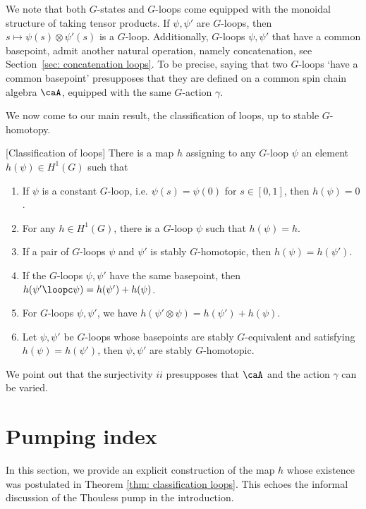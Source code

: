 We note that both $G$-states and $G$-loops come equipped with the monoidal structure of taking tensor products. If $\psi,\psi'$ are $G$-loops, then $s\mapsto \psi(s)\otimes\psi'(s)$ is a $G$-loop. Additionally, $G$-loops $\psi,\psi'$ that  have a common basepoint, 
admit another natural operation, namely concatenation, see Section~\ref{sec: concatenation loops}.  To be precise, saying that two $G$-loops `have a common basepoint' presupposes that they are defined on a common spin chain algebra $\caA$, equipped with the same $G$-action $\gamma$.

We now  come to our main result, the classification of loops, up to stable $G$-homotopy.


\begin{theorem}\label{thm: classification loops} [Classification of loops]
	There is a map $h$ assigning to any $G$-loop $\psi$ an element  $h(\psi) \in H^1(G)$ such that 
	\begin{enumerate}
		\item If $\psi$ is a constant $G$-loop, i.e. $\psi(s)=\psi(0)$ for $s\in[0,1]$, then $h(\psi)=0$. 
		\item For any $h \in H^1(G)$, there is a $G$-loop $\psi$ such that $h(\psi)=h$. 
		\item If a pair of $G$-loops $\psi$ and $\psi'$ is stably $G$-homotopic, then $h(\psi)=h(\psi')$.
		\item If the $G$-loops $\psi,\psi'$ have the same basepoint,  then  $h(\psi'\loopc \psi)=h(\psi')+h(\psi)$.
		\item For $G$-loops  $\psi,\psi'$, we have  $h(\psi'\otimes \psi)=h(\psi')+h(\psi)$.
		\item Let $\psi,\psi'$ be $G$-loops whose basepoints are stably $G$-equivalent and satisfying $h(\psi)=h(\psi')$, then $\psi,\psi'$ are stably $G$-homotopic. 
	\end{enumerate} 
\end{theorem}

\noindent We point out that the surjectivity $ii$ presupposes that $\caA$ and the action $\gamma$ can be varied.

\section{Pumping index}\label{sec: pumping index}

In this section, we provide an explicit construction of the map $h$ whose existence was postulated in Theorem \ref{thm: classification loops}. This echoes the informal
discussion of the Thouless pump in the introduction.

